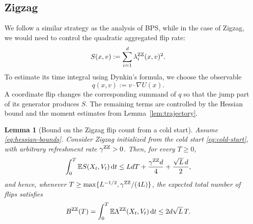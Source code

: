 \documentclass{amsart}
\theoremstyle{plain}
\newtheorem{lemma}[theorem]{Lemma}      %
\theoremstyle{definition}
\theoremstyle{remark}
\newcommand{\ud}{\,\mathrm{d}}
\newcommand{\EE}{\mathbb{E}}
\newcommand{\E}{\EE}
\newcommand{\1}{\mathbf 1}
\newcommand{\dd}{\ud}
\newcommand{\zz}{{\rm ZZ}}
\begin{document}
\subsection{Zigzag}\label{ssec:proof-zz}
We follow a similar strategy as the analysis of BPS, while in the case of Zigzag, we would need to control the quadratic aggregated flip rate:
\[
        S(x,v):=\sum_{i=1}^d\lambda_i^{\zz}(x,v)^2.
\]
To estimate its time integral using Dynkin's formula, we choose the observable
\[
        q(x,v):=v\cdot\nabla U(x).
\]
A coordinate flip changes the corresponding summand of $q$ so that the jump
part of its generator produces $S$.  The remaining terms are controlled by
the Hessian bound and the moment estimates from
Lemma~\ref{lem:trajectory}.

\begin{lemma}[Bound on the Zigzag flip count from a cold start]
\label{lem:zz-count}
Assume \eqref{eq:hessian-bounds}.
Consider Zigzag initialized from the cold start \eqref{eq:cold-start}, with
arbitrary refreshment rate $\gamma^{\zz}>0$.  Then, for every $T\ge0$,
\begin{equation}\label{eq:zz-square-rate-bound}
        \int_0^T\E S(X_t,V_t)\dd t
        \le LdT+\frac{\gamma^{\zz}d}{4}+\frac{\sqrt L\,d}{2},
\end{equation}
and hence, whenever
$T\ge\max\{L^{-1/2},\gamma^{\zz}/(4L)\}$, the expected total number of flips
satisfies
\begin{equation}\label{eq:zz-count-clean}
        B^{\zz}(T)
        =\int_0^T\E\Lambda^{\zz}(X_t,V_t)\dd t
        \le2d\sqrt L\,T .
\end{equation}
\end{lemma}
\end{document}

